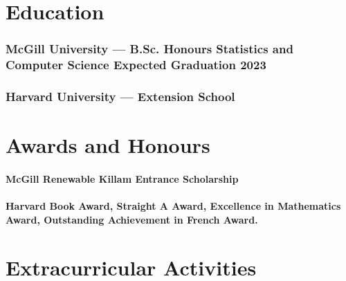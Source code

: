 \documentclass{article}
\begin{document}
\section{Education\hfill\normalsize }

\subsubsection{McGill University --- B.Sc. Honours Statistics and Computer Science \hfill Expected Graduation 2023}


\subsubsection{Harvard University --- Extension School}

% 

\section{Awards and Honours}

\paragraph{McGill Renewable Killam Entrance Scholarship}

\paragraph{Harvard Book Award, Straight A Award, Excellence in Mathematics Award, Outstanding Achievement in French Award.}


\section{Extracurricular Activities}
\end{document}
